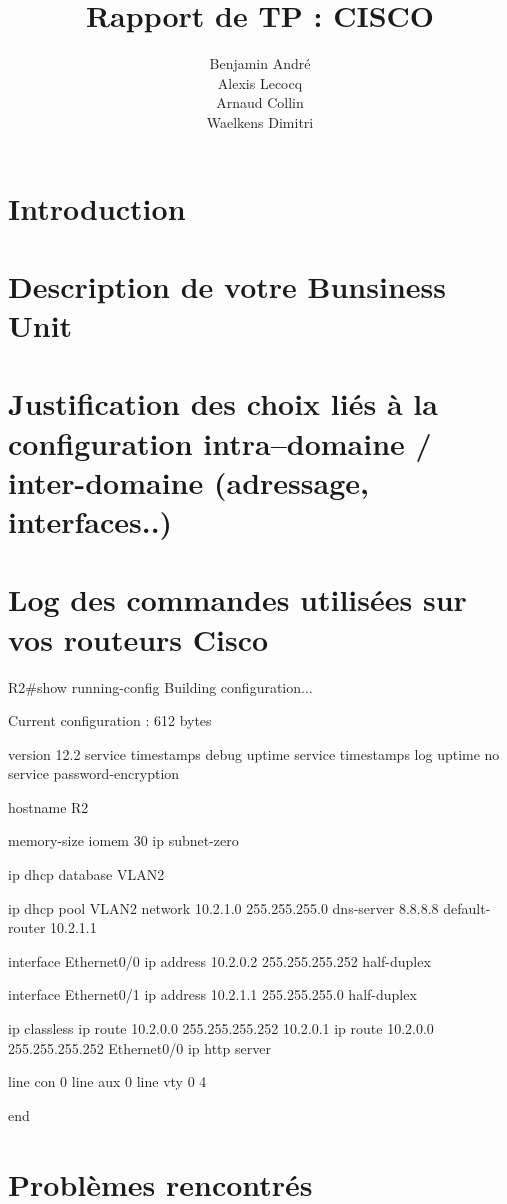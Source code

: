 \documentclass{article}
\author{Benjamin André\\Alexis Lecocq\\Arnaud Collin\\Waelkens Dimitri}
\title{Rapport de TP : CISCO}
\begin{document}
\maketitle

\section{Introduction}%

\section{Description de votre Bunsiness Unit}

\section{Justification des choix liés à la configuration intra--domaine / inter-domaine (adressage, interfaces..)}

\section{Log des commandes utilisées sur vos routeurs Cisco}

R2\#show running-config
Building configuration...

Current configuration : 612 bytes

version 12.2
service timestamps debug uptime
service timestamps log uptime
no service password-encryption

hostname R2

memory-size iomem 30
ip subnet-zero

ip dhcp database VLAN2

ip dhcp pool VLAN2
   network 10.2.1.0 255.255.255.0
   dns-server 8.8.8.8
   default-router 10.2.1.1

interface Ethernet0/0
 ip address 10.2.0.2 255.255.255.252
 half-duplex

interface Ethernet0/1
 ip address 10.2.1.1 255.255.255.0
 half-duplex

ip classless
ip route 10.2.0.0 255.255.255.252 10.2.0.1
ip route 10.2.0.0 255.255.255.252 Ethernet0/0
ip http server

line con 0
line aux 0
line vty 0 4

end

\section{Problèmes rencontrés}
\end{document}
